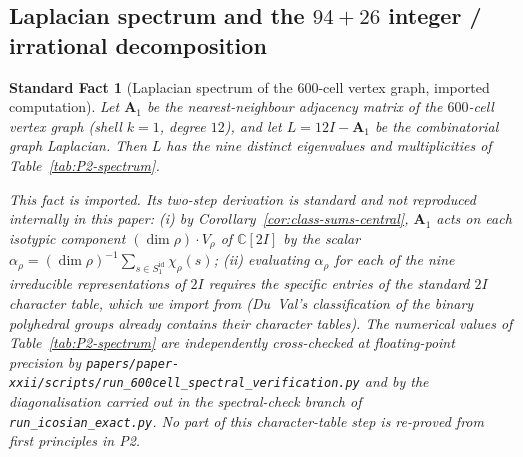 \documentclass[11pt, a4paper]{amsart}
\newtheorem{fact}[theorem]{Standard Fact}
\theoremstyle{definition}
\newcommand{\C}{\mathbb{C}}
\begin{document}
\subsection{Laplacian spectrum and the $94 + 26$ integer /
irrational decomposition}
\label{sec:spectrum-P2}

\begin{fact}[Laplacian spectrum of the $600$-cell vertex graph,
imported computation]
\label{prop:spectrum-P2}
Let $\mathbf{A}_1$ be the nearest-neighbour adjacency matrix of
the $600$-cell vertex graph (shell $k = 1$, degree $12$), and let
$L = 12 I - \mathbf{A}_1$ be the combinatorial graph Laplacian.
Then $L$ has the nine distinct eigenvalues and multiplicities of
Table~\ref{tab:P2-spectrum}.

This fact is imported. Its two-step derivation is standard and
not reproduced internally in this paper: (i) by
Corollary~\ref{cor:class-sums-central}, $\mathbf{A}_1$ acts on
each isotypic component $(\dim \rho) \cdot V_\rho$ of $\C[2I]$ by
the scalar $\alpha_\rho = (\dim \rho)^{-1} \sum_{s \in
S_1^{\mathrm{id}}} \chi_\rho(s)$; (ii) evaluating $\alpha_\rho$
for each of the nine irreducible representations of $2I$ requires
the specific entries of the standard $2I$ character table, which
we import from \cite[Ch.~3]{DuVal1964} (Du~Val's classification
of the binary polyhedral groups already contains their character
tables). The numerical values of Table~\ref{tab:P2-spectrum} are
independently cross-checked at floating-point precision by
\verb|papers/paper-xxii/scripts/run_600cell_spectral_verification.py|
and by the diagonalisation carried out in the spectral-check
branch of \texttt{run\_icosian\_exact.py}. No part of this
character-table step is re-proved from first principles in P2.
\end{fact}
\end{document}
